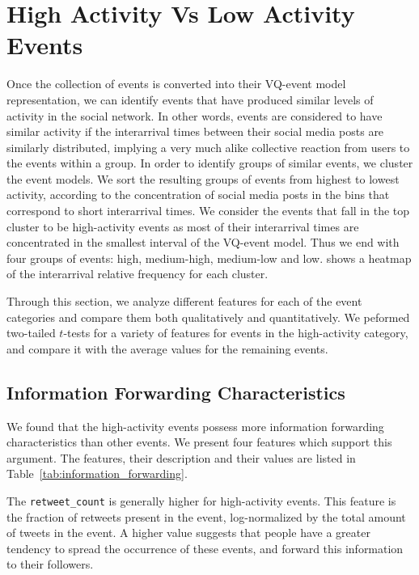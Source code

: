 \section{High Activity Vs Low Activity Events}
\label{sec:diff}
Once the collection of events is converted into their VQ-event model representation, 
we can identify events that have produced similar levels of activity in the social
network. In other words, events are considered to have similar activity if the interarrival times
between their social media posts are similarly distributed, implying a very much alike
collective reaction from users to the events within a group. In order to identify groups of
similar events, we cluster the event models. We sort the resulting groups of events from
highest to lowest activity, according to the concentration of social media posts in the bins that
correspond to short interarrival times. We consider the events that fall in the top cluster to be
high-activity events as most of their interarrival times are concentrated in the smallest interval
of the VQ-event model.
Thus we end with four groups of events: high, medium-high, medium-low and low.
shows a heatmap of the interarrival relative frequency for each cluster.




Through this section, we analyze different features for each of the event categories and
compare them both qualitatively and quantitatively.  We peformed two-tailed $t$-tests
for a variety of features for events in the high-activity category, and compare it with
the average values for the remaining events. 

\subsection{Information Forwarding Characteristics}
\label{subsec:info_forwarding}
We found that the high-activity events possess more information
forwarding characteristics than other events. We present four features
which support this argument. The features, their description and their
values are listed in Table~\ref{tab:information_forwarding}.

The \texttt{retweet\_count} is generally higher for high-activity
events. This feature is the fraction of retweets present in the event,
log-normalized by the total amount of tweets in the event. A higher
value suggests that people have a greater tendency to spread the
occurrence of these events, and forward this information to their
followers. 

